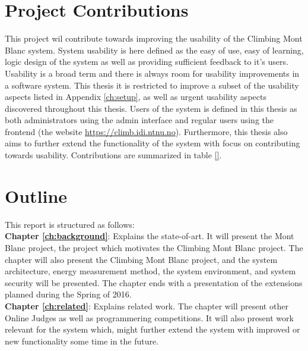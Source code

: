 \section{Project Contributions}
\label{sec:cont}
This project wil contribute towards improving the usability of the Climbing Mont Blanc system. System usability is here defined as the easy of use, easy of learning, logic design of the system as well as providing sufficient feedback to it's users. Usability is a broad term and there is always room for usability improvements in a software system. This thesis it is restricted to improve a subset of the usability aspects listed in Appendix \ref{ch:setup}, as well as urgent usability aspects discovered throughout this thesis. Users of the system is defined in this thesis as both administrators using the admin interface and regular users using the frontend (the website \url{https://climb.idi.ntnu.no}). Furthermore, this thesis also aims to further extend the functionality of the system with focus on contributing towards usability. Contributions are summarized in table \ref{}.



\section{Outline}
\label{sec:out}
This report is structured as follows:\\

\noindent
\textbf{Chapter \ref{ch:background}}: Explains the state-of-art. It will present the Mont Blanc project, the project which motivates the Climbing Mont Blanc project. The chapter will also present the Climbing Mont Blanc project, and the system architecture, energy measurement method, the system environment, and system security will be presented. The chapter ends with a presentation of the extensions planned during the Spring of 2016. \\

\textbf{Chapter \ref{ch:related}}: Explains related work. The chapter will present other Online Judges as well as programmering competitions. It will also present work relevant for the system which, might further extend the system with improved or new functionality some time in the future.
